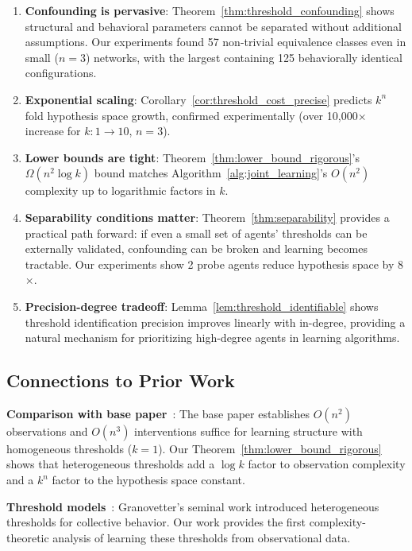 \documentclass[11pt]{article}
\begin{document}
\begin{enumerate}
\item \textbf{Confounding is pervasive}: Theorem~\ref{thm:threshold_confounding} shows structural and behavioral parameters cannot be separated without additional assumptions. Our experiments found 57 non-trivial equivalence classes even in small ($n=3$) networks, with the largest containing 125 behaviorally identical configurations.

\item \textbf{Exponential scaling}: Corollary~\ref{cor:threshold_cost_precise} predicts $k^n$ fold hypothesis space growth, confirmed experimentally (over 10,000$\times$ increase for $k:1\to10$, $n=3$).

\item \textbf{Lower bounds are tight}: Theorem~\ref{thm:lower_bound_rigorous}'s $\Omega(n^2 \log k)$ bound matches Algorithm~\ref{alg:joint_learning}'s $O(n^2)$ complexity up to logarithmic factors in $k$.

\item \textbf{Separability conditions matter}: Theorem~\ref{thm:separability} provides a practical path forward: if even a small set of agents' thresholds can be externally validated, confounding can be broken and learning becomes tractable. Our experiments show 2 probe agents reduce hypothesis space by 8$\times$.

\item \textbf{Precision-degree tradeoff}: Lemma~\ref{lem:threshold_identifiable} shows threshold identification precision improves linearly with in-degree, providing a natural mechanism for prioritizing high-degree agents in learning algorithms.
\end{enumerate}

\subsection{Connections to Prior Work}

\textbf{Comparison with base paper}~\cite{chistikov2020convergence}: The base paper establishes $O(n^2)$ observations and $O(n^3)$ interventions suffice for learning structure with homogeneous thresholds ($k=1$). Our Theorem~\ref{thm:lower_bound_rigorous} shows that heterogeneous thresholds add a $\log k$ factor to observation complexity and a $k^n$ factor to the hypothesis space constant.

\textbf{Threshold models}~\cite{granovetter1978threshold}: Granovetter's seminal work introduced heterogeneous thresholds for collective behavior. Our work provides the first complexity-theoretic analysis of learning these thresholds from observational data.
\end{document}
